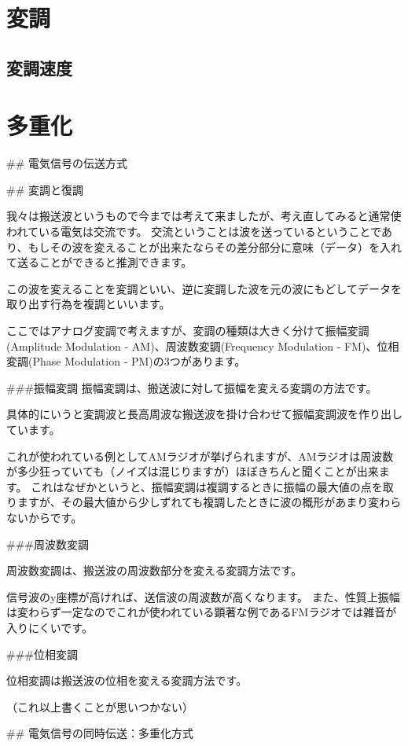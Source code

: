 \section{変調}

\subsection{変調速度}

\section{多重化}

## 電気信号の伝送方式

## 変調と復調

我々は搬送波というもので今までは考えて来ましたが、考え直してみると通常使われている電気は交流です。
交流ということは波を送っているということであり、もしその波を変えることが出来たならその差分部分に意味（データ）を入れて送ることができると推測できます。

この波を変えることを変調といい、逆に変調した波を元の波にもどしてデータを取り出す行為を複調といいます。

ここではアナログ変調で考えますが、変調の種類は大きく分けて振幅変調(Amplitude Modulation - AM)、周波数変調(Frequency Modulation - FM)、位相変調(Phase Modulation - PM)の3つがあります。

###振幅変調
振幅変調は、搬送波に対して振幅を変える変調の方法です。

具体的にいうと変調波と長高周波な搬送波を掛け合わせて振幅変調波を作り出しています。

これが使われている例としてAMラジオが挙げられますが、AMラジオは周波数が多少狂っていても（ノイズは混じりますが）ほぼきちんと聞くことが出来ます。
これはなぜかというと、振幅変調は複調するときに振幅の最大値の点を取りますが、その最大値から少しずれても複調したときに波の概形があまり変わらないからです。

###周波数変調

周波数変調は、搬送波の周波数部分を変える変調方法です。

信号波のy座標が高ければ、送信波の周波数が高くなります。
また、性質上振幅は変わらず一定なのでこれが使われている顕著な例であるFMラジオでは雑音が入りにくいです。

###位相変調

位相変調は搬送波の位相を変える変調方法です。

（これ以上書くことが思いつかない）

## 電気信号の同時伝送：多重化方式

